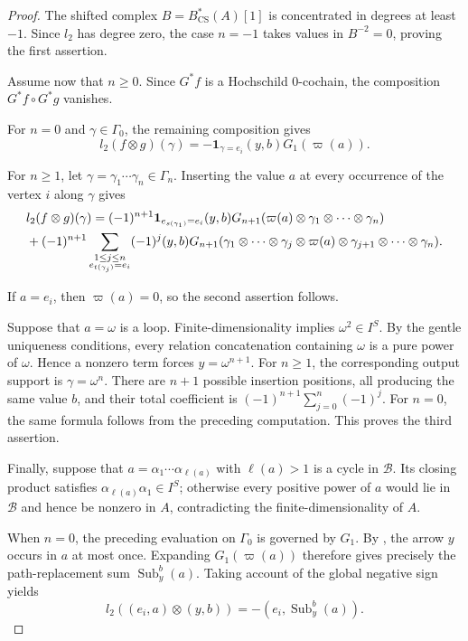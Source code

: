 \documentclass[11pt,a4paper,reqno]{amsart}
\newcommand{\mB}{\mathcal B}
\newcommand{\Sub}{\operatorname{Sub}}
\newcommand{\para}[2]{(#1,#2)}
\newcommand{\one}{\mathbf 1}
\theoremstyle{plain}
\theoremstyle{definition}
\numberwithin{equation}{section}
\begin{document}
	\begin{proof}
		The shifted complex
		$B=B_{\mathrm{CS}}^*(A)[1]$
		is concentrated in degrees at least $-1$. Since $l_2$ has degree zero,
		the case $n=-1$ takes values in $B^{-2}=0$, proving the first assertion.
		
		Assume now that $n\geq0$. Since $G^*f$ is a Hochschild $0$-cochain, the
		composition
		$G^*f\circ G^*g$
		vanishes.
		
		For $n=0$ and $\gamma\in\Gamma_0$, the remaining composition gives
		\[
		l_2(f\otimes g)(\gamma)
		=
		-\one_{\gamma=e_i}
		\para{y}{b}G_1(\varpi(a)).
		\]
		
		For $n\geq1$, let
		$\gamma=\gamma_1\cdots\gamma_n\in\Gamma_n$.
		Inserting the value $a$ at every occurrence of the vertex $i$ along
		$\gamma$ gives
		\begin{align}
			&l_2(f\otimes g)(\gamma)
			=
			(-1)^{n+1}
			\one_{e_{s(\gamma_1)}=e_i}
			\para{y}{b}G_{n+1}
			(
			\varpi(a)\otimes
			\gamma_1\otimes\cdots\otimes\gamma_n
			)
			\notag\\
			&+
			(-1)^{n+1}
			\sum_{\substack{1\leq j\leq n\\ e_{t(\gamma_j)}=e_i}}
			(-1)^j
			\para{y}{b}G_{n+1}
			(
			\gamma_1\otimes\cdots\otimes\gamma_j
			\otimes\varpi(a)
			\otimes\gamma_{j+1}\otimes\cdots\otimes\gamma_n
			).
			\label{eq:degree-minus-one-general}
		\end{align}
		
		If $a=e_i$, then $\varpi(a)=0$, so the second assertion follows.
		
		Suppose that $a=\omega$ is a loop. Finite-dimensionality implies
		$\omega^2\in I^S$.
		By the gentle uniqueness conditions, every relation concatenation
		containing $\omega$ is a pure power of $\omega$. Hence a nonzero term
		forces
		$y=\omega^{n+1}$.
		For $n\geq1$, the corresponding output support is
		$\gamma=\omega^n$.
		There are $n+1$ possible insertion positions, all producing the same
		value $b$, and their total coefficient is
		$(-1)^{n+1}\sum_{j=0}^{n}(-1)^j$.
		For $n=0$, the same formula follows from the preceding computation. This
		proves the third assertion.
		
		Finally, suppose that
		$a=\alpha_1\cdots\alpha_{\ell(a)}$ with $\ell(a)>1$ is a cycle in $\mB$. Its closing product satisfies
		$\alpha_{\ell(a)}\alpha_1\in I^S$;
		otherwise every positive power of $a$ would lie in $\mB$ and hence be nonzero in $A$,
		contradicting the finite-dimensionality of $A$.
		
		When $n=0$, the preceding evaluation on $\Gamma_0$ is governed by
		$G_1$. By , the arrow $y$ occurs in $a$ at most once.
		Expanding $G_1(\varpi(a))$ therefore gives precisely the path-replacement
		sum $\Sub_y^b(a)$. Taking account of the global negative sign yields
		\[
		l_2(
		\para{e_i}{a}\otimes\para{y}{b}
		)
		=
		-\para{e_i}{\Sub_y^b(a)}.
		\]
		

\end{proof}
\end{document}
